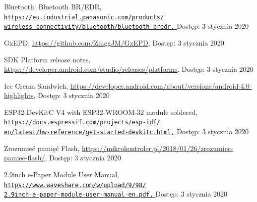 \documentclass[a4paper,12pt, twoside]{article}
\begin{document}
\begin{thebibliography}{}
    		Bluetooth: Bluetooth BR/EDR,
    		\newline\href{https://eu.industrial.panasonic.com/products/wireless-connectivity/bluetooth/bluetooth-bredr}
    		 {\nolinkurl{https://eu.industrial.panasonic.com/products/}
                 \\
                  \nolinkurl{wireless-connectivity/bluetooth/bluetooth-bredr,}
                 }
    		\newline Dostęp: 3 stycznia 2020
    
    		GxEPD,
    		\newline\url{https://github.com/ZinggJM/GxEPD}, 
    		\newline Dostęp: 3 stycznia 2020
    		
    		SDK Platform release notes,
    		\newline\url{https://developer.android.com/studio/releases/platforms}, 
    		\newline Dostęp: 3 stycznia 2020
    		
    		Ice Cream Sandwich,
    		\newline\url{https://developer.android.com/about/versions/android-4.0-highlights}, 
    		\newline Dostęp: 3 stycznia 2020
    		
    		 ESP32-DevKitC V4 with ESP32-WROOM-32 module soldered,
    		\newline\href{https://docs.espressif.com/projects/esp-idf/en/latest/hw-reference/get-started-devkitc.html}
    		 {\nolinkurl{https://docs.espressif.com/projects/esp-idf/}
                 \\
                  \nolinkurl{en/latest/hw-reference/get-started-devkitc.html,}
                 }
    		\newline Dostęp: 3 stycznia 2020
    		
    		Zrozumieć pamięć Flash,
    		\newline\url{https://mikrokontroler.pl/2018/01/26/zrozumiec-pamiec-flash/}, 
    		\newline Dostęp: 3 stycznia 2020
    		
    		2.9inch e-Paper Module User Manual,
    		\newline\href{https://www.waveshare.com/w/upload/9/98/2.9inch-e-paper-module-user-manual-en.pdf}
    		 {\nolinkurl{https://www.waveshare.com/w/upload/9/98/}
                 \\
                  \nolinkurl{2.9inch-e-paper-module-user-manual-en.pdf,}
                 }
    		\newline Dostęp: 3 stycznia 2020
    		

\end{thebibliography}
\end{document}
